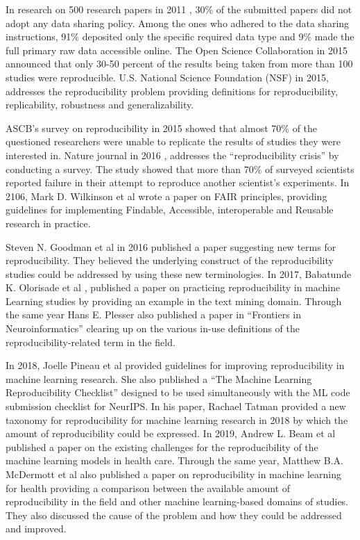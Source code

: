 In research on 500 research papers in 2011 \cite{alsheikh-ali_public_2011},  30\% of the submitted papers did not adopt 
any data sharing policy. Among the ones who adhered to the data sharing instructions, 91\% deposited only the 
specific required data type and 9\% made the full primary raw data accessible online. The Open Science Collaboration 
in 2015 \cite{open_science_collaboration_estimating_2015} announced that only 30-50 percent of the results being taken 
from more than 100 studies were reproducible. U.S. National Science Foundation (NSF) \cite{cacioppo_social_2015} in 2015, 
addresses the reproducibility problem providing definitions for reproducibility, replicability, robustness and generalizability.  

ASCB’s survey on reproducibility in 2015 \cite{ascb_ascb_2015} showed that almost 70\% of the questioned researchers 
were unable to replicate the results of studies they were interested in. Nature journal in 2016 \cite{baker_1500_2016}, 
addresses the “reproducibility crisis” by conducting a survey. The study showed that more than 70\% of surveyed 
scientists reported failure in their attempt to reproduce another scientist's experiments.  In 2106, Mark D. Wilkinson et al 
\cite{wilkinson_fair_2016} wrote a paper on FAIR principles, providing guidelines for implementing Findable, 
Accessible, interoperable and Reusable research in practice.

Steven N. Goodman et al in 2016 \cite{goodman_what_2016} published a paper suggesting new terms for reproducibility. 
They believed the underlying construct of the reproducibility studies could be addressed by using these new terminologies. 
In 2017, Babatunde K. Olorisade et al \cite{olorisade_reproducibility_2017}, published a paper on practicing reproducibility 
in machine Learning studies by providing an example in the text mining domain. Through the same year 
Hans E. Plesser \cite{plesser_reproducibility_2018} also published a paper in “Frontiers in Neuroinformatics” 
clearing up on the various in-use definitions of the reproducibility-related term in the field.

In 2018, Joelle Pineau et al \cite{pineau_improving_2020} provided guidelines for improving reproducibility in 
machine learning research. She also published a “The Machine Learning Reproducibility Checklist”  designed to be used 
simultaneously with the ML code submission checklist for NeurIPS. In his paper, Rachael Tatman \cite{tatman_practical_2018} 
provided a new taxonomy for reproducibility for machine learning research in 2018 by which the amount of reproducibility 
could be expressed. In 2019, Andrew L. Beam et al \cite{beam_challenges_2020} published a paper on the existing 
challenges for the reproducibility of the machine learning models in health care. Through the same year, 
Matthew B.A. McDermott et al \cite{mcdermott_reproducibility_2019} also published a paper on reproducibility in 
machine learning for health providing a comparison between the available amount of reproducibility in the field 
and other machine learning-based domains of studies. They also discussed the cause of the problem and how they 
could be addressed and improved.

